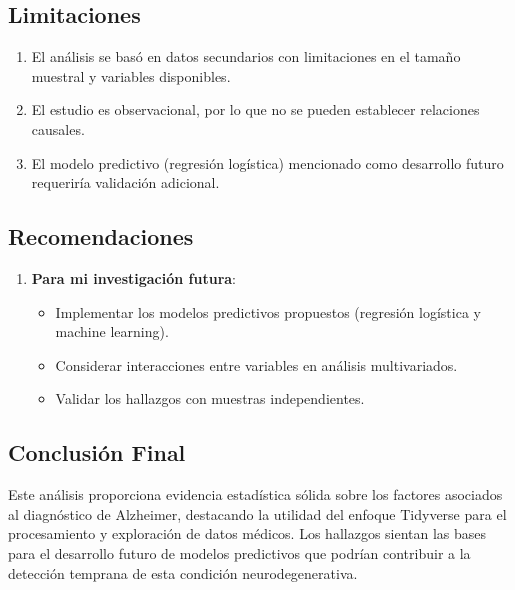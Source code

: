 \documentclass[
  letterpaper,
  DIV=11,
  numbers=noendperiod]{scrartcl}
\begin{document}
\subsection{\texorpdfstring{\textbf{Limitaciones}}{Limitaciones}}\label{limitaciones}

\begin{enumerate}
\def\labelenumi{\arabic{enumi}.}
\item
  El análisis se basó en datos secundarios con limitaciones en el tamaño
  muestral y variables disponibles.
\item
  El estudio es observacional, por lo que no se pueden establecer
  relaciones causales.
\item
  El modelo predictivo (regresión logística) mencionado como desarrollo
  futuro requeriría validación adicional.
\end{enumerate}

\subsection{\texorpdfstring{\textbf{Recomendaciones}}{Recomendaciones}}\label{recomendaciones}

\begin{enumerate}
\def\labelenumi{\arabic{enumi}.}
\item
  \textbf{Para mi investigación futura}:

  \begin{itemize}
  \item
    Implementar los modelos predictivos propuestos (regresión logística
    y machine learning).
  \item
    Considerar interacciones entre variables en análisis multivariados.
  \item
    Validar los hallazgos con muestras independientes.
  \end{itemize}
\end{enumerate}

\subsection{\texorpdfstring{\textbf{Conclusión
Final}}{Conclusión Final}}\label{conclusiuxf3n-final}

Este análisis proporciona evidencia estadística sólida sobre los
factores asociados al diagnóstico de Alzheimer, destacando la utilidad
del enfoque Tidyverse para el procesamiento y exploración de datos
médicos. Los hallazgos sientan las bases para el desarrollo futuro de
modelos predictivos que podrían contribuir a la detección temprana de
esta condición neurodegenerativa.
\end{document}
